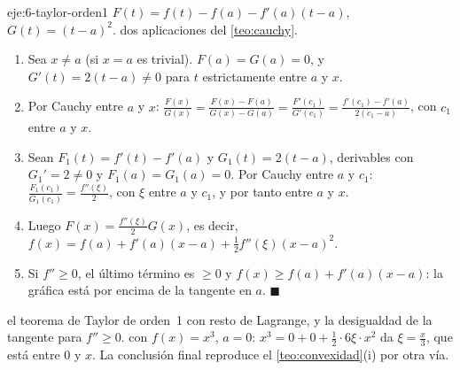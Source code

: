 \begin{solucion}{eje:6-taylor-orden1}
\datos $F(t)=f(t)-f(a)-f'(a)(t-a)$, $G(t)=(t-a)^{2}$.
\planteamiento dos aplicaciones del \cref{teo:cauchy}.
\pasos
\begin{enumerate}[label=\arabic*.]
  \item Sea $x\ne a$ (si $x=a$ es trivial). $F(a)=G(a)=0$, y $G'(t)=2(t-a)\ne0$ para $t$ estrictamente entre $a$ y $x$.
  \item Por Cauchy entre $a$ y $x$: $\frac{F(x)}{G(x)}=\frac{F(x)-F(a)}{G(x)-G(a)}=\frac{F'(c_1)}{G'(c_1)}=\frac{f'(c_1)-f'(a)}{2(c_1-a)}$, con $c_1$ entre $a$ y $x$.
  \item Sean $F_1(t)=f'(t)-f'(a)$ y $G_1(t)=2(t-a)$, derivables con $G_1'=2\ne0$ y $F_1(a)=G_1(a)=0$. Por Cauchy entre $a$ y $c_1$: $\frac{F_1(c_1)}{G_1(c_1)}=\frac{f''(\xi)}{2}$, con $\xi$ entre $a$ y $c_1$, y por tanto entre $a$ y $x$.
  \item Luego $F(x)=\frac{f''(\xi)}{2}G(x)$, es decir, $f(x)=f(a)+f'(a)(x-a)+\frac12f''(\xi)(x-a)^{2}$.
  \item Si $f''\ge0$, el último término es $\ge0$ y $f(x)\ge f(a)+f'(a)(x-a)$: la gráfica está por encima de la tangente en $a$. \hfill$\blacksquare$
\end{enumerate}
\resultado el teorema de Taylor de orden~1 con resto de Lagrange, y la desigualdad de la tangente para $f''\ge0$.
\comprobacion con $f(x)=x^{3}$, $a=0$: $x^{3}=0+0+\frac12\cdot6\xi\cdot x^{2}$ da $\xi=\frac x3$, que está entre $0$ y $x$. La conclusión final reproduce el \cref{teo:convexidad}(i) por otra vía.
\end{solucion}

